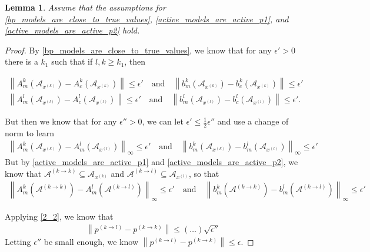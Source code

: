 \documentclass{article}
\newtheorem{lemma}[theorem]{Lemma}
\theoremstyle{case}
\newcommand{\xk}{{x^{(k)}}}
\begin{document}
\begin{lemma}
\label{bounded_projection_theorem}
Assume that the assumptions for 
\cref{bp_models_are_close_to_true_values}, \cref{active_models_are_active_p1},  and \cref{active_models_are_active_p2} hold.

\end{lemma}
\begin{proof}
By \cref{bp_models_are_close_to_true_values}, we know that for any $\epsilon' > 0$ there is a $k_1$ such that if $l,k \ge k_1$, then

\begin{align*}
\left\|A^k_m\left(\mathcal A_{\xk}\right) - A^k_c\left(\mathcal A_{\xk}\right) \right\| \le \epsilon' \quad \textrm{and} \quad
\left\|b^k_m\left(\mathcal A_{\xk}\right) - b^k_c\left(\mathcal A_{\xk}\right) \right\| \le \epsilon' \\
\left\|A^l_m\left(\mathcal A_{x^{(l)}}\right) - A^l_c\left(\mathcal A_{x^{(l)}}\right) \right\| \le \epsilon' \quad \textrm{and} \quad
\left\|b^l_m\left(\mathcal A_{x^{(l)}}\right) - b^l_c\left(\mathcal A_{x^{(l)}}\right) \right\| \le \epsilon'.
\end{align*}

But then we know that for any $\epsilon'' > 0$, we can let $\epsilon' \le \frac 1 2 \epsilon''$ and use a change of norm to learn
\begin{align*}
\left\|A^k_m\left(\mathcal A_{\xk}\right) - A^l_m\left(\mathcal A_{x^{(l)}}\right) \right\|_{\infty} \le \epsilon' \quad \textrm{and} \quad
\left\|b^k_m\left(\mathcal A_{\xk}\right) - b^l_m\left(\mathcal A_{x^{(l)}}\right) \right\|_{\infty} \le \epsilon'
\end{align*}
But by \cref{active_models_are_active_p1} and \cref{active_models_are_active_p2}, we know that 
$\mathcal A^{(k \to k)} \subseteq \mathcal A_{\xk}$ and $\mathcal A^{(k \to l)} \subseteq \mathcal A_{x^{(l)}}$, so that
\begin{align*}
\left\|A^k_m\left(\mathcal A^{(k \to k)} \right) - A^l_m\left(\mathcal A^{(k \to l)}\right) \right\|_{\infty} \le \epsilon' \quad \textrm{and} \quad
\left\|b^k_m\left(\mathcal A^{(k \to k)} \right) - b^l_m\left(\mathcal A^{(k \to l)}\right) \right\|_{\infty} \le \epsilon'
\end{align*}

Applying \cref{2_2}, we know that 
\begin{align*}
\left\|p^{(k\to l)} - p^{(k\to k)}\right\| \le \left(\ldots\right) \sqrt{\epsilon''}
\end{align*}
Letting $\epsilon''$ be small enough, we know $\left\|p^{(k\to l)} - p^{(k\to k)}\right\| \le \epsilon$.
\end{proof}
\end{document}
